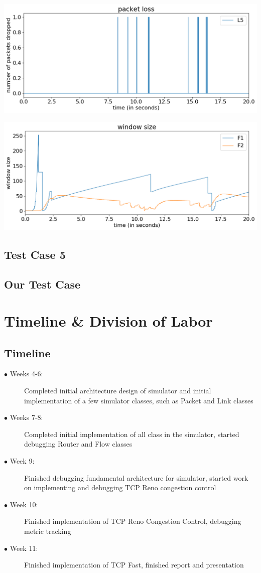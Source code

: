 \documentclass{article}
\begin{document}
\includegraphics[width = \textwidth]{"test_case4 packet loss"}

\includegraphics[width = \textwidth]{"test_case4 window size"}




\subsection{Test Case 5}


\subsection{Our Test Case}


\section{Timeline \& Division of Labor}

\subsection{Timeline}

\begin{description}
  \item[$\bullet$ Weeks 4-6:] Completed initial architecture design of simulator and initial implementation of a few simulator classes, such as Packet and Link classes
  \item[$\bullet$ Weeks 7-8:] Completed initial implementation of all class in the simulator, started debugging Router and Flow classes 
  \item[$\bullet$ Week 9:] Finished debugging fundamental architecture for simulator, started work on implementing and debugging TCP Reno congestion control
  \item[$\bullet$ Week 10:] Finished implementation of TCP Reno Congestion Control, debugging metric tracking
  \item[$\bullet$ Week 11:] Finished implementation of TCP Fast, finished report and presentation
\end{description}
\end{document}
